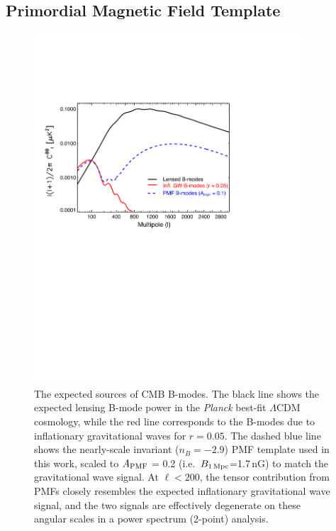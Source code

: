 \documentclass[apj]{emulateapj}
\newcommand{\apmf}{\ensuremath{A_{\rm PMF}}}
\newcommand{\bpmf}{\ensuremath{B_{\rm 1\,Mpc}}}
\newcommand{\lcdm}{\ensuremath{\Lambda}CDM}
\newcommand{\planck}{{\sl Planck}}
\begin{document}
\subsection{Primordial Magnetic Field Template}
\label{sec:template}

\begin{figure}[htb]\centering
\includegraphics[width=0.9\textwidth,clip,trim={.5cm 12.cm 6cm 5cm}]{pmf_templates.pdf}
  \caption[CMB polarization from PMFs]{
  The expected sources of CMB B-modes.
  The black line shows the expected lensing B-mode power in the \planck{} best-fit \lcdm{} cosmology, while the red line corresponds to the B-modes due to inflationary gravitational waves for $r=0.05$. 
  The dashed blue line shows the nearly-scale invariant ($n_B=-2.9$) PMF template used in this work, scaled to \apmf{} = 0.2 (i.e.~\bpmf{}=1.7\,nG) to match the gravitational wave signal. 
  At $\ell < 200$, the tensor contribution from PMFs closely resembles the expected inflationary gravitational wave signal, and the two signals are effectively degenerate on these angular scales in a power spectrum (2-point) analysis.
      \label{fig:pmf-bb}
  }
\end{figure}
\end{document}
